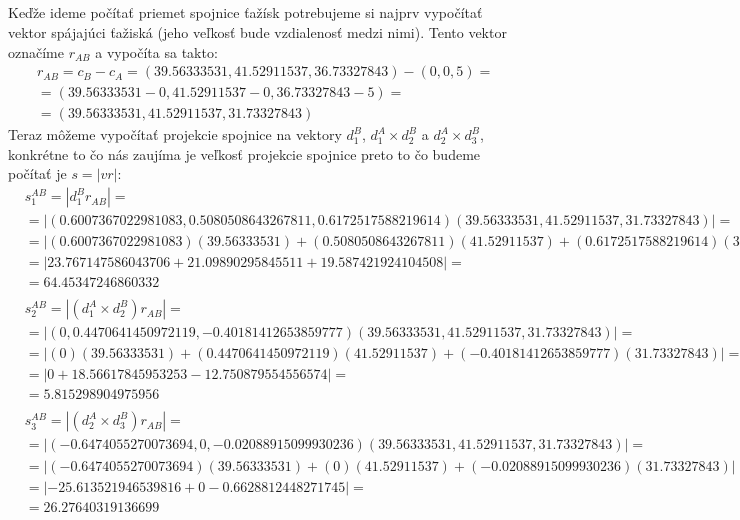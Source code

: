 \documentclass[a4paper]{article}
\begin{document}
	\subsection{}
	Keďže ideme počítať priemet spojnice ťažísk potrebujeme si najprv vypočítať vektor spájajúci ťažiská (jeho veľkosť bude vzdialenosť medzi nimi). Tento vektor označíme $r_{AB}$ a vypočíta sa takto:
	\\
	\begin{align*}
		&r_{AB} = c_B - c_A = (39.56333531, 41.52911537, 36.73327843) - (0, 0, 5) =
		\\
		&= (39.56333531-0, 41.52911537-0, 36.73327843-5) =
		\\
		&= (39.56333531, 41.52911537, 31.73327843)
	\end{align*}
	Teraz môžeme vypočítať projekcie spojnice na vektory $d_1^B$, $d_1^A \times d_2^B$ a $d_2^A \times d_3^B$, konkrétne to čo nás zaujíma je veľkosť projekcie spojnice preto to čo budeme počítať je $s = |v r|$:
	\begin{align*}
		&s_1^{AB} = |d_1^B r_{AB} | = 
		\\
		&= | (0.6007367022981083, 0.5080508643267811, 0.6172517588219614) (39.56333531, 41.52911537, 31.73327843) | =
		\\
		&=| (0.6007367022981083)(39.56333531) + (0.5080508643267811)(41.52911537) + (0.6172517588219614)(31.73327843)  | =
		\\
		&= | 23.767147586043706+ 21.09890295845511+ 19.587421924104508 | =
		\\
		&= 64.45347246860332
		\\
		\\
		&s_2^{AB} = |(d_1^A \times d_2^B) r_{AB} | = 
		\\
		&= | (0, 0.4470641450972119, -0.40181412653859777) (39.56333531, 41.52911537, 31.73327843) | =
		\\
		&=| (0)(39.56333531) + (0.4470641450972119)(41.52911537) + (-0.40181412653859777)(31.73327843)  | =
		\\
		&= | 0+18.56617845953253 -12.750879554556574| =
		\\
		&= 5.815298904975956
		\\
		\\
		&s_3^{AB} = |(d_2^A \times d_3^B) r_{AB} | = 
		\\
		&= | (-0.6474055270073694, 0, -0.02088915099930236) (39.56333531, 41.52911537, 31.73327843) | =
		\\
		&=| (-0.6474055270073694)(39.56333531) + (0)(41.52911537) + (-0.02088915099930236)(31.73327843)  | =
		\\
		&= | -25.613521946539816+ 0-0.6628812448271745 | =
		\\
		&= 26.27640319136699
		\\
	\end{align*} 
	\newpage
\end{document}
